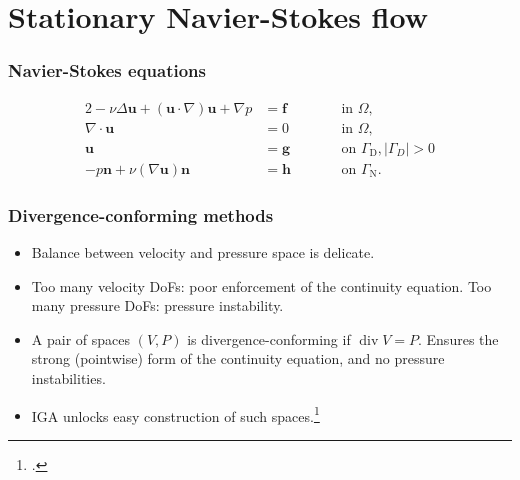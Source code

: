 \documentclass{beamer}
\begin{document}
\section{Stationary Navier-Stokes flow}

\begin{frame}
  \frametitle{Navier-Stokes equations}

  \begin{alignat*}{2}
    -\nu \Delta \bm u + (\bm u \cdot \nabla) \bm u + \nabla p &= \bm f && \qquad \text{in } \Omega, \\
    \nabla \cdot \bm u &= 0 && \qquad \text{in } \Omega, \\
    \bm u &= \bm g && \qquad \text{on } \Gamma_\text{D}, |\Gamma_D| > 0 \\
    -p \bm n + \nu (\nabla \bm u) \bm n &= \bm h && \qquad \text{on } \Gamma_\text{N}.
  \end{alignat*}
\end{frame}

\begin{frame}
  \frametitle{Divergence-conforming methods}

  \begin{itemize}
  \item Balance between velocity and pressure space is delicate.
  \item Too many velocity DoFs: poor enforcement of the continuity equation. Too many pressure DoFs:
    pressure instability.
  \item A pair of spaces $(V,P)$ is divergence-conforming if $\operatorname{div} V = P$. Ensures the strong
    (pointwise) form of the continuity equation, and no pressure instabilities.
  \item IGA unlocks easy construction of such spaces.\footcite{Buffa2010iae,Evans2013idc1}
  \end{itemize}
\end{frame}
\end{document}
